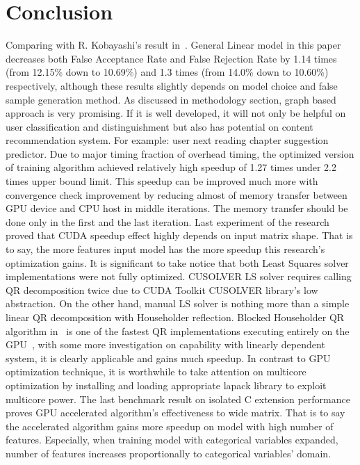 \documentclass[English]{dicomopapers}
\begin{document}
\section{Conclusion}
Comparing with R. Kobayashi’s result in~\cite{kobayashi1}. General Linear model in this paper decreases both False Acceptance Rate and False Rejection Rate by 1.14 times (from 12.15\% down to 10.69\%) and 1.3 times (from 14.0\% down to 10.60\%) respectively, although these results slightly depends on model choice and false sample generation method. As discussed in methodology section, graph based approach is very promising. If it is well developed, it will not only be helpful on user classification and distinguishment but also has potential on content recommendation system. For example: user next reading chapter suggestion predictor.\newline
Due to major timing fraction of overhead timing, the optimized version of training algorithm achieved relatively high speedup of 1.27 times under 2.2 times upper bound limit. This speedup can be improved much more with convergence check improvement by reducing almost of memory transfer between GPU device and CPU host in middle iterations. The memory transfer should be done only in the first and the last iteration. Last experiment of the research proved that CUDA speedup effect highly depends on input matrix shape. That is to say, the more features input model has the more speedup this research's optimization gains. It is significant to take notice that both Least Squares solver implementations were not fully optimized. CUSOLVER LS solver requires calling QR decomposition twice due to CUDA Toolkit CUSOLVER library's low abstraction. On the other hand, manual LS solver is nothing more than a simple linear QR decomposition with Householder reflection. Blocked Householder QR algorithm in~\cite{Kerr:2009:QDG:1513895.1513904} is one of the fastest QR implementations executing entirely on the GPU~\cite{Kerr:2009:QDG:1513895.1513904}, with some more investigation on capability with linearly dependent system, it is clearly applicable and gains much speedup. In contrast to GPU optimization technique, it is worthwhile to take attention on multicore optimization by installing and loading appropriate lapack library to exploit multicore power.\newline
The last benchmark result on isolated C extension performance proves GPU accelerated algorithm's effectiveness to wide matrix. That is to say the accelerated algorithm gains more speedup on model with high number of features. Especially, when training model with categorical variables expanded, number of features increases proportionally to categorical variables' domain.



\end{document}
